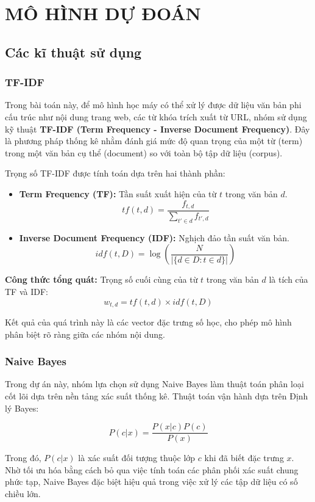 \documentclass[a4paper,12pt]{report}
\begin{document}
\chapter{MÔ HÌNH DỰ ĐOÁN}

\section{Các kĩ thuật sử dụng}

\subsection{TF-IDF}
Trong bài toán này, để mô hình học máy có thể xử lý được dữ liệu văn bản phi cấu trúc như nội dung trang web, các từ khóa trích xuất từ URL, nhóm sử dụng kỹ thuật \textbf{TF-IDF (Term Frequency - Inverse Document Frequency)}. Đây là phương pháp thống kê nhằm đánh giá mức độ quan trọng của một từ (term) trong một văn bản cụ thể (document) so với toàn bộ tập dữ liệu (corpus).

Trọng số TF-IDF được tính toán dựa trên hai thành phần:
\begin{itemize}
    \item \textbf{Term Frequency (TF):} Tần suất xuất hiện của từ $t$ trong văn bản $d$.
    $$tf(t, d) = \frac{f_{t,d}}{\sum_{t' \in d} f_{t',d}}$$
    \item \textbf{Inverse Document Frequency (IDF):} Nghịch đảo tần suất văn bản.
    $$idf(t, D) = \log \left( \frac{N}{|\{d \in D : t \in d\}|} \right)$$
\end{itemize}

\textbf{Công thức tổng quát:}
Trọng số cuối cùng của từ $t$ trong văn bản $d$ là tích của TF và IDF:
$$w_{t,d} = tf(t, d) \times idf(t, D)$$

Kết quả của quá trình này là các vector đặc trưng số học, cho phép mô hình phân biệt rõ ràng giữa các nhóm nội dung.

\subsection{Naive Bayes}
Trong dự án này, nhóm lựa chọn sử dụng Naive Bayes làm thuật toán phân loại cốt lõi dựa trên nền tảng xác suất thống kê. Thuật toán vận hành dựa trên Định lý Bayes:

$$P(c|x) = \frac{P(x|c)P(c)}{P(x)}$$

Trong đó, $P(c|x)$ là xác suất đối tượng thuộc lớp $c$ khi đã biết đặc trưng $x$. Nhờ tối ưu hóa bằng cách bỏ qua việc tính toán các phân phối xác suất chung phức tạp, Naive Bayes đặc biệt hiệu quả trong việc xử lý các tập dữ liệu có số chiều lớn.
\end{document}
